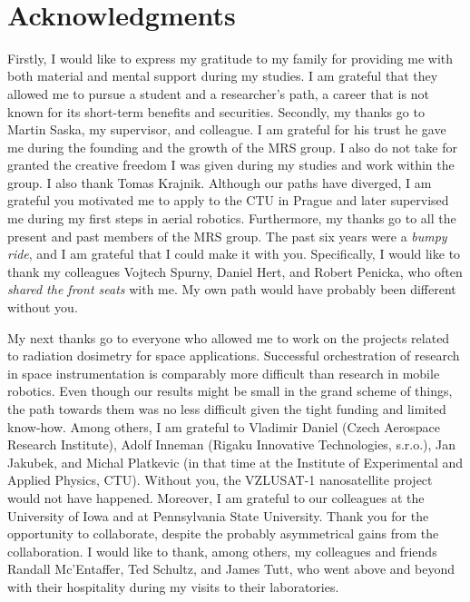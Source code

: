 
~\vfill{}

\section*{Acknowledgments}

Firstly, I would like to express my gratitude to my family for providing me with both material and mental support during my studies.
I am grateful that they allowed me to pursue a student and a researcher's path, a career that is not known for its short-term benefits and securities.
Secondly, my thanks go to Martin Saska, my supervisor, and colleague.
I am grateful for his trust he gave me during the founding and the growth of the MRS group.
I also do not take for granted the creative freedom I was given during my studies and work within the group.
I also thank Tomas Krajnik.
Although our paths have diverged, I am grateful you motivated me to apply to the CTU in Prague and later supervised me during my first steps in aerial robotics.
Furthermore, my thanks go to all the present and past members of the MRS group.
The past six years were a \emph{bumpy ride}, and I am grateful that I could make it with you.
Specifically, I would like to thank my colleagues Vojtech Spurny, Daniel Hert, and Robert Penicka, who often \emph{shared the front seats} with me.
My own path would have probably been different without you.

My next thanks go to everyone who allowed me to work on the projects related to radiation dosimetry for space applications.
Successful orchestration of research in space instrumentation is comparably more difficult than research in mobile robotics.
Even though our results might be small in the grand scheme of things, the path towards them was no less difficult given the tight funding and limited know-how.
Among others, I am grateful to Vladimir Daniel (Czech Aerospace Research Institute), Adolf Inneman (Rigaku Innovative Technologies, s.r.o.), Jan Jakubek, and Michal Platkevic (in that time at the Institute of Experimental and Applied Physics, CTU).
Without you, the VZLUSAT-1 nanosatellite project would not have happened.
Moreover, I am grateful to our colleagues at the University of Iowa and at Pennsylvania State University.
Thank you for the opportunity to collaborate, despite the probably asymmetrical gains from the collaboration.
I would like to thank, among others, my colleagues and friends Randall Mc'Entaffer, Ted Schultz, and James Tutt, who went above and beyond with their hospitality during my visits to their laboratories.

